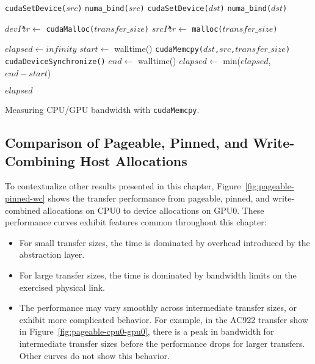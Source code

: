 \begin{algorithm}[H]
	\begin{algorithmic}[1]
		\Statex
		\State \texttt{cudaSetDevice($src$)}
		\Else {}
		\State \texttt{numa\_bind($src$)}
		\EndIf
		\State \texttt{cudaSetDevice($dst$)}
		\Else {}
		\State \texttt{numa\_bind($dst$)}
		\EndIf
		
		\State $devPtr \gets$ \texttt{cudaMalloc($transfer\_size$)} 
		\State $srcPtr \gets$ \texttt{malloc($transfer\_size$)} 
		
		\State $elapsed \gets infinity$ 
		\State $start \gets$ walltime()
		\State \texttt{cudaMemcpy($dst$,$src$,$transfer\_size$)}
		\State \texttt{cudaDeviceSynchronize()}
		\State $end \gets$ walltime()
		\State $elapsed \gets$ min($elapsed$, $end-start$)
		\EndFor
		
		\Return $elapsed$
		\EndFunction
		
	\end{algorithmic}
	\caption[Measuring CPU/GPU bandwidth with \texttt{cudaMemcpy}]{
        Measuring CPU/GPU bandwidth with \texttt{cudaMemcpy}.
	}
	\label{alg:explicit-cpu-gpu}
\end{algorithm}

\subsection{Comparison of Pageable, Pinned, and Write-Combining Host Allocations}
\label{sec:explicit-pageable-pinned-wc}

To contextualize other results presented in this chapter, Figure~\ref{fig:pageable-pinned-wc} shows the transfer performance from pageable, pinned, and write-combined allocations on CPU0 to device allocations on GPU0.
These performance curves exhibit features common throughout this chapter:
\begin{itemize}
	\item For small transfer sizes, the time is dominated by overhead introduced by the abstraction layer.
	\item For large transfer sizes, the time is dominated by bandwidth limits on the exercised physical link.
	\item The performance may vary smoothly across intermediate transfer sizes, or exhibit more complicated behavior.
	For example, in the AC922 transfer show in Figure~\ref{fig:pageable-cpu0-gpu0}, there is a peak in bandwidth for intermediate transfer sizes before the performance drops for larger transfers.
	Other curves do not show this behavior.
\end{itemize}

